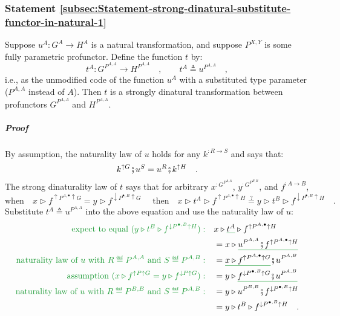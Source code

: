 \subsubsection{Statement \label{subsec:Statement-strong-dinatural-substitute-functor-in-natural-1}\ref{subsec:Statement-strong-dinatural-substitute-functor-in-natural-1}}

Suppose $u^{A}:G^{A}\rightarrow H^{A}$ is a natural transformation,
and suppose $P^{X,Y}$ is some fully parametric profunctor. Define
the function $t$ by:
\[
t^{A}:G^{P^{A,A}}\rightarrow H^{P^{A,A}}\quad,\quad\quad t^{A}\triangleq u^{P^{A,A}}\quad,
\]
i.e., as the unmodified code of the function $u^{A}$ with a substituted
type parameter ($P^{A,A}$ instead of $A$). Then $t$ is a strongly
dinatural transformation between profunctors $G^{P^{A,A}}$ and $H^{P^{A,A}}$.

\subparagraph{Proof}

By assumption, the naturality law of $u$ holds for any $k^{:R\rightarrow S}$
and says that:
\[
k^{\uparrow G}\bef u^{S}=u^{R}\bef k^{\uparrow H}\quad.
\]
The strong dinaturality law of $t$ says that for arbitrary $x^{:G^{P^{A,A}}}$,
$y^{:G^{P^{B,B}}}$, and $f^{:A\rightarrow B}$,
\[
\text{when}\quad x\triangleright f^{\uparrow P^{A,\bullet}\uparrow G}=y\triangleright f^{\downarrow P^{\bullet,B}\uparrow G}\quad\text{ then}\quad x\triangleright t^{A}\triangleright f^{\uparrow P^{A,\bullet}\uparrow H}\overset{?}{=}y\triangleright t^{B}\triangleright f^{\downarrow P^{\bullet,B}\uparrow H}\quad.
\]
Substitute $t^{A}\triangleq u^{P^{A,A}}$ into the above equation
and use the naturality law of $u$:
\begin{align*}
{\color{greenunder}\text{expect to equal }(y\triangleright t^{B}\triangleright f^{\downarrow P^{\bullet,B}\uparrow H}):}\quad & x\triangleright\gunderline{t^{A}}\triangleright f^{\uparrow P^{A,\bullet}\uparrow H}\\
 & =x\triangleright\gunderline{u^{P^{A,A}}\bef f^{\uparrow P^{A,\bullet}\uparrow H}}\\
{\color{greenunder}\text{naturality law of }u\text{ with }R\triangleq P^{A,A}\text{ and }S\triangleq P^{A,B}:}\quad & =\gunderline{x\triangleright f^{\uparrow P^{A,\bullet}\uparrow G}}\bef u^{P^{A,B}}\\
{\color{greenunder}\text{assumption }(x\triangleright f^{\uparrow P\uparrow G}=y\triangleright f^{\downarrow P\uparrow G}):}\quad & =y\triangleright\gunderline{f^{\downarrow P^{\bullet,B}\uparrow G}\bef u^{P^{A,B}}}\\
{\color{greenunder}\text{naturality law of }u\text{ with }R\triangleq P^{B,B}\text{ and }S\triangleq P^{A,B}:}\quad & =y\triangleright u^{P^{B,B}}\bef f^{\downarrow P^{\bullet,B}\uparrow H}\\
 & =y\triangleright t^{B}\triangleright f^{\downarrow P^{\bullet,B}\uparrow H}\quad.
\end{align*}


